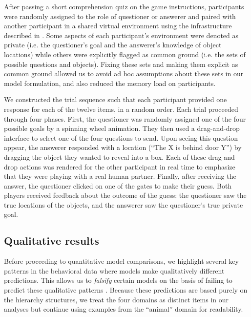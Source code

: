 \documentclass[11pt, floatsintext]{apa6}
\begin{document}
After passing a short comprehension quiz on the game instructions, participants were randomly assigned to the role of questioner or answerer and paired with another participant in a shared virtual environment using the infrastructure described in . 
Some aspects of each participant's environment were denoted as private (i.e. the questioner's goal and the answerer's knowledge of object locations) while others were explicitly flagged as common ground (i.e. the sets of possible questions and objects).
Fixing these sets and making them explicit as common ground allowed us to avoid ad hoc assumptions about these sets in our model formulation, and also reduced the memory load on participants.


We constructed the trial sequence such that each participant provided one response for each of the twelve items, in a random order.
Each trial proceeded through four phases. 
First, the questioner was randomly assigned one of the four possible goals by a spinning wheel animation.
They then used a drag-and-drop interface to select one of the four questions to send.
Upon seeing this question appear, the answerer responded with a location (``The X is behind door Y'') by dragging the object they wanted to reveal into a box. 
Each of these drag-and-drop actions was rendered for the other participant in real time to emphasize that they were playing with a real human partner.
Finally, after receiving the answer, the questioner clicked on one of the gates to make their guess. 
Both players received feedback about the outcome of the guess: the questioner saw the true locations of the objects, and the answerer saw the questioner's true private goal. 

\subsection{Qualitative results}

Before proceeding to quantitative model comparisons, we highlight several key patterns in the behavioral data where models make qualitatively different predictions. 
This allows us to \emph{falsify} certain models on the basis of failing to predict these qualitative patterns \cite{palminteri2017importance}.
Because these predictions are based purely on the hierarchy structures, we treat the four domains as distinct items in our analyses but continue using examples from the ``animal'' domain for readability.
\end{document}
